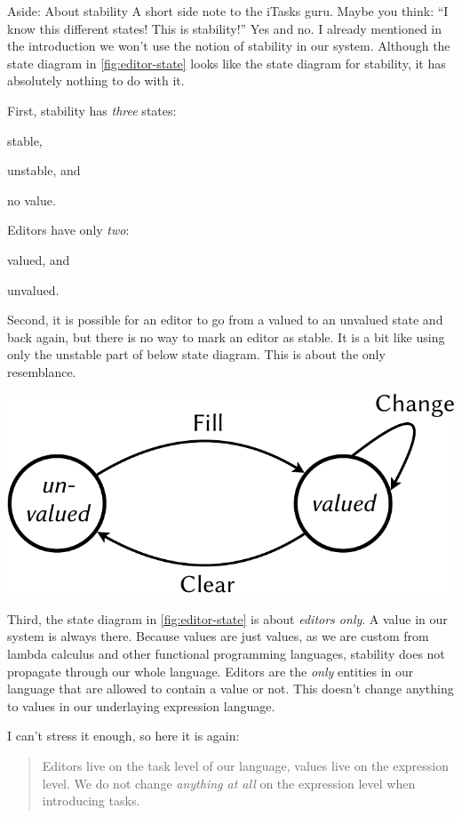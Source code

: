 \begin{margintext}{Aside: About stability}
A short side note to the iTasks guru.
Maybe you think: \enquote{I know this different states! This is stability!}
Yes and no.
I already mentioned in the introduction we won't use the notion of stability in our system.
Although the state diagram in \autoref{fig:editor-state} looks like the state diagram for stability,
it has absolutely nothing to do with it.

First, stability has \emph{three} states:
\begin{enumerate*}
  \item stable,
  \item unstable, and
  \item no value.
\end{enumerate*}
Editors have only \emph{two}:
\begin{enumerate*}
  \item valued, and
  \item unvalued.
\end{enumerate*}

Second,
it is possible for an editor to go from a valued to an unvalued state and back again,
but there is no way to mark an editor as stable.
It is a bit like using only the unstable part of below state diagram.
This is about the only resemblance.

\includegraphics[width=\marginwidth,page=2]{figures/editor-state-crop.pdf}

Third,
the state diagram in \autoref{fig:editor-state} is about \emph{editors only}.
A value in our system is always there.
Because values are just values,
as we are custom from lambda calculus and other functional programming languages,
stability does not propagate through our whole language.
Editors are the \emph{only} entities in our language that are allowed to contain a value or not.
This doesn't change anything to values in our underlaying expression language.

I can't stress it enough, so here it is again:
\begin{quote}
Editors live on the task level of our language,
values live on the expression level.
We do not change \emph{anything at all} on the expression level when introducing tasks.
\end{quote}
\end{margintext}

